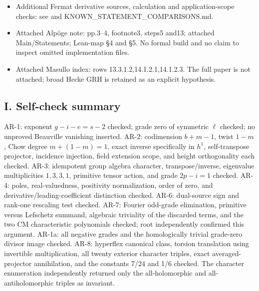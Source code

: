 \documentclass[11pt,a4paper]{article}
\begin{document}
\begin{itemize}
  Gu 2026: \url{https://arxiv.org/abs/2609.33223} . Local primary v2 read at
   and its extracted text: Theorem 1.3, Proposition 5.3, §2.2
  and Corollary 1.6; root's complete AR-10 proof independently checked
  against these statements.
\item
  Additional Fermat derivative sources, calculation and
  application-scope checks: see  and
  KNOWN\_STATEMENT\_COMPARISONS.md.
\item
  Attached Alpöge note: pp.3--4, footnote3, steps5 and13; attached
  Main/Statements; Lean-map §4 and §5. No formal build and no claim to
  inspect omitted implementation files.
\item
  Attached Masullo index: rows 13.3.1.2,14.1.2.1,14.1.2.3. The full
  paper is not attached; broad Hecke GRH is retained as an explicit
  hypothesis.
\end{itemize}

\subsection{I. Self-check summary}\label{i.-self-check-summary}

AR-1: exponent \(g-i-e=s-2\) checked; grade zero of symmetric \(\ell\)
checked; no unproved Beauville vanishing inserted. AR-2: codimension
\(b+m-1\), twist \(1-m\), Chow degree \(m+(1-m)=1\), exact inverse
specifically in \(h^1\), self-transpose projector, incidence injection,
field extension scope, and height orthogonality each checked. AR-3:
idempotent group algebra character, transpose/inverse, eigenvalue
multiplicities \(1,3,3,1\), primitive tensor action, and grade
\(2p-i=1\) checked. AR-4: poles, real-valuedness, positivity
normalization, order of zero, and derivative/leading-coefficient
distinction checked. AR-6: dual-source sign and rank-one rescaling test
checked. AR-7: Fourier odd-grade elimination, primitive versus Lefschetz
summand, algebraic triviality of the discarded terms, and the two CM
characteristic polynomials checked; root independently confirmed this
argument. AR-1a: all negative grades and the homologically trivial
grade-zero divisor image checked. AR-8: hyperflex canonical class,
torsion translation using invertible multiplication, all twenty exterior
character triples, exact averaged-projector annihilation, and the
constants 7/24 and 1/6 checked. The character enumeration independently
returned only the all-holomorphic and all-antiholomorphic triples as
invariant.
\end{document}
